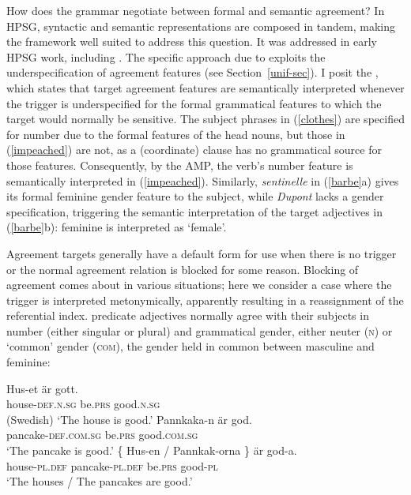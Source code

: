 \documentclass[output=paper
 	        ,biblatex
                ,babelshorthands
                ,newtxmath
                ,draftmode
                ,colorlinks, citecolor=brown
]{langscibook}
\begin{document}
How does the grammar negotiate between formal and semantic agreement?  In HPSG, syntactic and semantic representations are composed in tandem, making the framework well suited to address this question.   It was addressed in early HPSG work, including .   The specific approach due to  exploits the underspecification of agreement features (see Section~\ref{unif-sec}).  I posit the , which states that target agreement features are semantically interpreted whenever the trigger is underspecified for the formal grammatical features to which the target would normally be sensitive.   The subject phrases in (\ref{clothes}) are specified for number due to the formal features of the head nouns, but those in (\ref{impeached}) are not, as a (coordinate) clause has no grammatical source for those features.  Consequently, by the AMP, the verb's number feature is semantically interpreted in (\ref{impeached}).  Similarly, \textit{sentinelle} in (\ref{barbe}a) gives its formal feminine gender feature to the subject, while \textit{Dupont} lacks a gender specification, triggering the semantic interpretation of the target adjectives in (\ref{barbe}b): feminine is interpreted as `female'.    

Agreement targets generally have a default form for use when there is no trigger or the normal agreement relation is blocked for some reason.   
Blocking of agreement comes about in various situations; here we  consider a case where the trigger is interpreted metonymically, apparently resulting in a reassignment of the referential index.   predicate adjectives normally agree with their subjects in number (either singular or plural) and grammatical gender, either neuter (\textsc{n}) or `common' gender (\textsc{com}), the gender held in common between masculine and feminine: 

\begin{exe} 
\ex \label{huset}
 \begin{xlist}
\ex 
\gll Hus-et 	är	gott. \\
     house-\textsc{def.n.sg}	be.\textsc{prs}	good.\textsc{n.sg} \\\hfill(Swedish)
\glt	`The house is good.’
\ex   
\gll Pannkaka-n 	         är	         god. \\
     pancake-\textsc{def.com.sg} be.\textsc{prs} good.\textsc{com.sg} \\
\glt	`The pancake is good.’
\ex   
\gll   \{   Hus-en / Pannkak-orna 	\}	är	god-a. \\
	   {}   house-\textsc{pl.def} {} pancake-\textsc{pl.def} {} be.\textsc{prs} good-\textsc{pl}  \\
\glt	`The houses / The pancakes are good.’
\end{xlist}
\end{exe}
\end{document}
